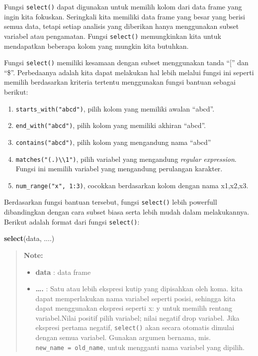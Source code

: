 \documentclass[]{book}
\newenvironment{Shaded}{\begin{snugshade}}{\end{snugshade}}
\newcommand{\KeywordTok}[1]{\textcolor[rgb]{0.13,0.29,0.53}{\textbf{#1}}}
\newcommand{\NormalTok}[1]{#1}
\providecommand{\tightlist}{%
  \setlength{\itemsep}{0pt}\setlength{\parskip}{0pt}}
\begin{document}
Fungsi \texttt{select()} dapat digunakan untuk memilih kolom dari data
frame yang ingin kita fokuskan. Seringkali kita memiliki data frame yang
besar yang berisi semua data, tetapi setiap analisis yang diberikan
hanya menggunakan subset variabel atau pengamatan. Fungsi
\texttt{select()} memungkinkan kita untuk mendapatkan beberapa kolom
yang mungkin kita butuhkan.

Fungsi \texttt{select()} memiliki kesamaan dengan subset menggunakan
tanda ``{[}'' dan ``\$''. Perbedaanya adalah kita dapat melakukan hal
lebih melalui fungsi ini seperti memilih berdasarkan kriteria tertentu
menggunakan fungsi bantuan sebagai berikut:

\begin{enumerate}
\def\labelenumi{\arabic{enumi}.}
\tightlist
\item
  \texttt{starts\_with("abcd")}, pilih kolom yang memiliki awalan
  ``abcd''.
\item
  \texttt{end\_with("abcd")}, pilih kolom yang memiliki akhiran
  ``abcd''.
\item
  \texttt{contains("abcd")}, pilih kolom yang mengandung nama ``abcd''
\item
  \texttt{matches("(.)\textbackslash{}\textbackslash{}1")}, pilih
  variabel yang mengandung \emph{regular expression}. Fungsi ini memilih
  variabel yang mengandung perulangan karakter.
\item
  \texttt{num\_range("x",\ 1:3)}, cocokkan berdasarkan kolom dengan nama
  x1,x2,x3.
\end{enumerate}

Berdasarkan fungsi bantuan tersebut, fungsi \texttt{select()} lebih
powerfull dibandingkan dengan cara subset biasa serta lebih mudah dalam
melakukannya. Berikut adalah format dari fungsi \texttt{select()}:

\begin{Shaded}
\begin{Highlighting}[]
\KeywordTok{select}\NormalTok{(data, ....)}
\end{Highlighting}
\end{Shaded}

\begin{quote}
\textbf{Note: }

\begin{itemize}
\tightlist
\item
  \textbf{data} : data frame
\item
  \textbf{\ldots{}.} : Satu atau lebih ekspresi kutip yang dipisahkan
  oleh koma. kita dapat memperlakukan nama variabel seperti posisi,
  sehingga kita dapat menggunakan ekspresi seperti x: y untuk memilih
  rentang variabel.Nilai positif pilih variabel; nilai negatif drop
  variabel. Jika ekspresi pertama negatif, \texttt{select()} akan secara
  otomatis dimulai dengan semua variabel. Gunakan argumen bernama, mis.
  \texttt{new\_name\ =\ old\_name}, untuk mengganti nama variabel yang
  dipilih.
\end{itemize}
\end{quote}
\end{document}
